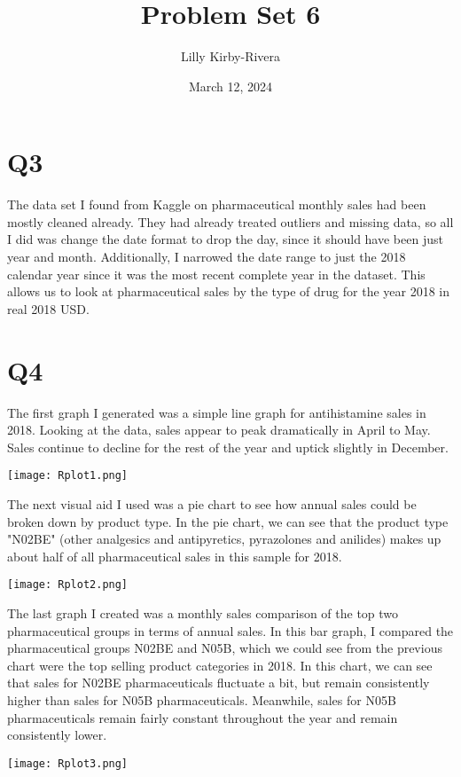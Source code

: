 \documentclass{article}
\title{Problem Set 6}
\author{Lilly Kirby-Rivera}
\date{March 12, 2024}
\begin{document}
\maketitle

\section*{Q3}
The data set I found from Kaggle on pharmaceutical monthly sales had been mostly cleaned already. They had already treated outliers and missing data, so all I did was change the date format to drop the day, since it should have been just year and month. Additionally, I narrowed the date range to just the 2018 calendar year since it was the most recent complete year in the dataset. This allows us to look at pharmaceutical sales by the type of drug for the year 2018 in real 2018 USD.

\section*{Q4}
The first graph I generated was a simple line graph for antihistamine sales in 2018. Looking at the data, sales appear to peak dramatically in April to May. Sales continue to decline for the rest of the year and uptick slightly in December.
\begin{center}
    \texttt{[image: Rplot1.png]}
\end{center}

    

\par The next visual aid I used was a pie chart to see how annual sales could be broken down by product type. In the pie chart, we can see that the product type "N02BE" (other analgesics and antipyretics, pyrazolones and anilides) makes up about half of all pharmaceutical sales in this sample for 2018.
\begin{center}
    \texttt{[image: Rplot2.png]}
\end{center}


\par The last graph I created was a monthly sales comparison of the top two pharmaceutical groups in terms of annual sales. In this bar graph, I compared the pharmaceutical groups N02BE and N05B, which we could see from the previous chart were the top selling product categories in 2018. In this chart, we can see that sales for N02BE pharmaceuticals fluctuate a bit, but remain consistently higher than sales for N05B pharmaceuticals. Meanwhile, sales for N05B pharmaceuticals remain fairly constant throughout the year and remain consistently lower.
\begin{center}
    \texttt{[image: Rplot3.png]}
\end{center}
\end{document}
